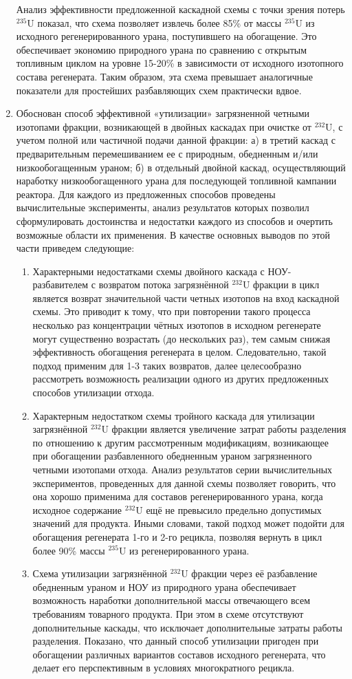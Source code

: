 \begin{enumerate}
Анализ эффективности предложенной каскадной схемы с точки зрения потерь $^{235}$U показал, что схема позволяет извлечь более 85\% от массы $^{235}$U из исходного регенерированного урана, поступившего на обогащение. Это обеспечивает экономию природного урана по сравнению с открытым топливным циклом на уровне 15-20\% в зависимости от исходного изотопного состава регенерата. Таким образом, эта схема превышает аналогичные показатели для простейших разбавляющих схем практически вдвое.
\item Обоснован способ эффективной «утилизации» загрязненной четными изотопами фракции, возникающей в двойных каскадах при очистке от $^{232}$U, с учетом полной или частичной подачи данной фракции: а) в третий каскад с предварительным перемешиванием ее с природным, обедненным и/или низкообогащенным ураном; б) в отдельный двойной каскад, осуществляющий наработку низкообогащенного урана для последующей топливной кампании реактора. Для каждого из предложенных способов проведены вычислительные эксперименты, анализ результатов которых позволил сформулировать достоинства и недостатки каждого из способов и очертить возможные области их применения.
В качестве основных выводов по этой части приведем следующие:
\begin{enumerate}
\item Характерными недостатками схемы двойного каскада с НОУ-разбавителем с возвратом потока загрязнённой $^{232}$U фракции в цикл является возврат значительной части четных изотопов на вход каскадной схемы. Это приводит к тому, что при повторении такого процесса несколько раз концентрации чётных изотопов в исходном регенерате могут существенно возрастать (до нескольких раз), тем самым снижая эффективность обогащения регенерата в целом. Следовательно, такой подход применим для 1-3 таких возвратов, далее целесообразно рассмотреть возможность реализации одного из других предложенных способов утилизации отхода.
\item Характерным недостатком схемы тройного каскада для утилизации загрязнённой $^{232}$U фракции является увеличение затрат работы разделения по отношению к другим рассмотренным модификациям, возникающее при обогащении разбавленного обедненным ураном загрязненного четными изотопами отхода. Анализ результатов серии вычислительных экспериментов, проведенных для данной схемы позволяет говорить, что она хорошо применима для составов регенерированного урана, когда исходное содержание $^{232}$U ещё не превысило предельно допустимых значений для продукта. Иными словами, такой подход может подойти для обогащения регенерата 1-го и 2-го рецикла, позволяя вернуть в цикл более 90\% массы $^{235}$U из регенерированного урана. 
\item Схема утилизации загрязнённой $^{232}$U фракции через её разбавление обедненным ураном и НОУ из природного урана обеспечивает возможность наработки дополнительной массы отвечающего всем требованиям товарного продукта. При этом в схеме отсутствуют дополнительные каскады, что исключает дополнительные затраты работы разделения. Показано, что данный способ утилизации пригоден при обогащении различных вариантов составов исходного регенерата, что делает его перспективным в условиях многократного рецикла.
\end{enumerate}


\end{enumerate}
